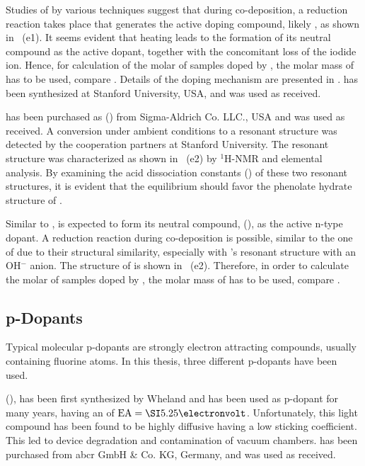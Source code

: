 Studies of \meodmbiI by various techniques suggest that during co-deposition, a reduction reaction takes place that generates the active doping compound, likely \meodmbi, as shown in ~(e1).
It seems evident that heating leads to the formation of its neutral compound as the active dopant, together with the concomitant loss of the iodide ion.
Hence, for calculation of the molar \CLong of samples doped by \meodmbiI, the molar mass of \meodmbi has to be used, compare .
Details of the doping mechanism are presented in . %
%
\meodmbiI has been synthesized at Stanford University, USA, and was used as received.

\dmbiPOH has been purchased as \OHdmbi (\OHdmbiLong) from Sigma-Aldrich Co. LLC., USA and was used as received. A conversion under ambient conditions to a resonant structure was detected by the cooperation partners at Stanford University. The resonant structure was characterized as shown in ~(e2) by $^1$H-NMR and elemental analysis. By examining the acid dissociation constants (\pKa) of these two resonant structures, it is evident that the equilibrium should favor the phenolate hydrate structure of \dmbiPOH.

Similar to \meodmbiI, \dmbiPOH is expected to form its neutral compound, \OHdmbi (\OHdmbiLong), as the active n-type dopant. A reduction reaction during co-deposition is possible, similar to the one of \meodmbiI due to their structural similarity, especially with \dmbiPOH's resonant structure with an OH$^-$ anion.
The structure of \OHdmbi is shown in ~(e2).
Therefore, in order to calculate the molar \CLong of samples doped by \dmbiPOH, the molar mass of \OHdmbi has to be used, compare .

\subsection{p-Dopants}\label{sec:Matp}
Typical molecular p-dopants are strongly electron attracting compounds, usually containing fluorine atoms. In this thesis, three different p-dopants have been used.

\minisec{\FV}
\FV (\FVLong), has been first synthesized by Wheland\etal\cite{Wheland1975} and has been used as p-dopant for many years\cite{Blochwitz1998,Pfeiffer1998}, having an \EA of \mbox{$\text{EA}=\eV{5.25}$}\cite{Gao2001}.
Unfortunately, this light compound has been found to be highly diffusive having a low sticking coefficient\cite{Koech2010}. This led to device degradation and contamination of vacuum chambers.
\FV has been purchased from abcr GmbH \& Co. KG, Germany, and was used as received.


